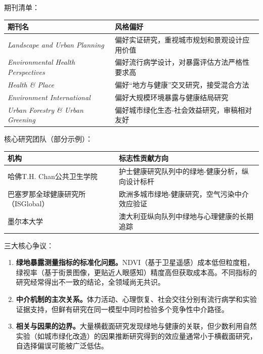 \begin{aibox}
期刊清单：

\begin{formalTable}[H]
\begin{tabular}{p{4.5cm} p{8cm}}
\toprule
\textbf{期刊名} & \textbf{风格偏好} \\
\midrule
\textit{Landscape and Urban Planning} & 偏好实证研究，重视城市规划和景观设计应用价值 \\
\textit{Environmental Health Perspectives} & 偏好流行病学设计，对暴露评估方法严格性要求高 \\
\textit{Health \& Place} & 偏好``地方与健康''交叉研究，接受混合方法 \\
\textit{Environment International} & 偏好大规模环境暴露与健康结局研究 \\
\textit{Urban Forestry \& Urban Greening} & 偏好城市绿化生态-社会效益研究，审稿相对友好 \\
\bottomrule
\end{tabular}
\end{formalTable}

\smallskip
核心研究团队（部分示例）：

\begin{formalTable}[H]
\begin{tabular}{p{4.5cm} p{8cm}}
\toprule
\textbf{机构} & \textbf{标志性贡献方向} \\
\midrule
哈佛T.H. Chan公共卫生学院 & 护士健康研究队列中的绿地-健康分析，纵向设计标杆 \\
巴塞罗那全球健康研究所（ISGlobal） & 欧洲多城市绿地-健康研究，空气污染中介效应验证 \\
墨尔本大学 & 澳大利亚纵向队列中绿地与心理健康的长期追踪 \\
\bottomrule
\end{tabular}
\end{formalTable}

三大核心争议：

\begin{enumerate}[label=\arabic*.]
\item \textbf{绿地暴露测量指标的标准化问题。}NDVI（基于卫星遥感）成本低但粒度粗，绿视率（基于街景图像，更贴近人眼感知）精度高但获取成本高。不同指标的研究经常得出不一致的结论，全领域尚无共识。
\item \textbf{中介机制的主次关系。}体力活动、心理恢复、社会交往分别有流行病学和实验证据支持，但鲜有研究在同一模型中同时检验多个竞争性中介路径。
\item \textbf{相关与因果的边界。}大量横截面研究发现绿地与健康的关联，但少数利用自然实验（如城市绿化改造）的因果推断研究得到的效应量通常小于横截面研究，自选择偏误可能被广泛低估。
\end{enumerate}
\end{aibox}

